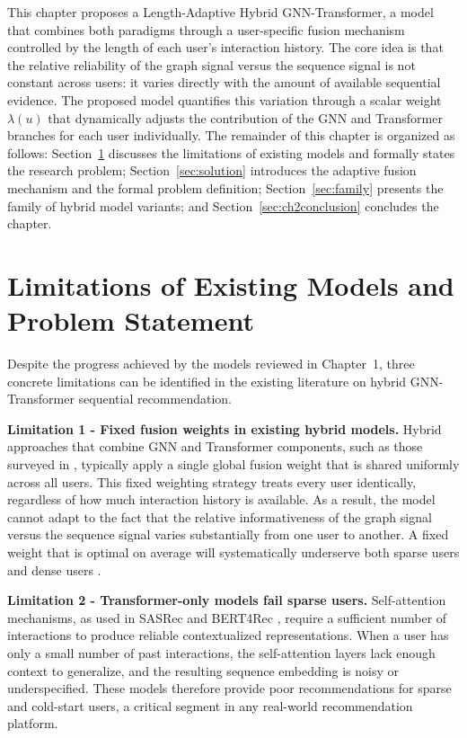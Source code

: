\documentclass[12pt,a4paper]{report}
\begin{document}
This chapter proposes a Length-Adaptive Hybrid GNN-Transformer, a model that
combines both paradigms through a user-specific fusion mechanism controlled by
the length of each user's interaction history. The core idea is that the
relative reliability of the graph signal versus the sequence signal is not
constant across users: it varies directly with the amount of available
sequential evidence. The proposed model quantifies this variation through a
scalar weight \(\lambda(u)\) that dynamically adjusts the contribution of the
GNN and Transformer branches for each user individually. The remainder of this
chapter is organized as follows: Section~\ref{sec:limitations} discusses the
limitations of existing models and formally states the research problem;
Section~\ref{sec:solution} introduces the adaptive fusion mechanism and the
formal problem definition; Section~\ref{sec:family} presents the family of
hybrid model variants; and Section~\ref{sec:ch2conclusion} concludes the
chapter.


\section{Limitations of Existing Models and Problem Statement}
\label{sec:limitations}

Despite the progress achieved by the models reviewed in Chapter~1, three
concrete limitations can be identified in the existing literature on hybrid
GNN-Transformer sequential recommendation.

\textbf{Limitation 1 - Fixed fusion weights in existing hybrid models.}
Hybrid approaches that combine GNN and Transformer components, such as those
surveyed in \citep{wu2020gnnsurvey}, typically apply a single global fusion
weight that is shared uniformly across all users. This fixed weighting strategy
treats every user identically, regardless of how much interaction history is
available. As a result, the model cannot adapt to the fact that the relative
informativeness of the graph signal versus the sequence signal varies
substantially from one user to another. A fixed weight that is optimal on
average will systematically underserve both sparse users and dense users
\citep{pan2024survey}.

\textbf{Limitation 2 - Transformer-only models fail sparse users.}
Self-attention mechanisms, as used in SASRec \citep{kang2018sasrec} and
BERT4Rec \citep{sun2019bert4rec}, require a sufficient number of interactions
to produce reliable contextualized representations. When a user has only a
small number of past interactions, the self-attention layers lack enough context
to generalize, and the resulting sequence embedding is noisy or
underspecified. These models therefore provide poor recommendations for sparse
and cold-start users, a critical segment in any real-world recommendation
platform.
\end{document}
